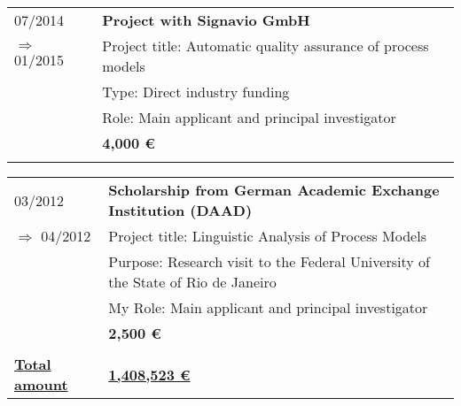 \begin{tabular}{P{3cm}P{12cm}}		
07/2014															& \textbf{Project with Signavio GmbH} \\
\hspace*{0.4cm} $\Rightarrow$ 01/2015 		& Project title: Automatic quality assurance of process models 	 \\
																		& Type: Direct industry funding \\
																		& Role: Main applicant and principal investigator \\\noalign{\smallskip}
																		& \textbf{4,000  \euro} \\
																		& \\
\end{tabular}														
\begin{tabular}{P{3cm}P{12cm}}																																								
03/2012															& \textbf{Scholarship from German Academic Exchange Institution (DAAD)}	\\
	\hspace*{0.4cm} $\Rightarrow$ 04/2012 	& Project title: Linguistic Analysis of Process Models \\
																		& Purpose: Research visit to the Federal University of the State of Rio de Janeiro  \\
																		& My Role: Main applicant and principal investigator\\	\noalign{\smallskip}																				
																		& \textbf{2,500 \euro} \\
																		\\
\underline{\textbf{Total amount}}					& \underline{\textbf{1,408,523 \euro}} \\																																														
\end{tabular}